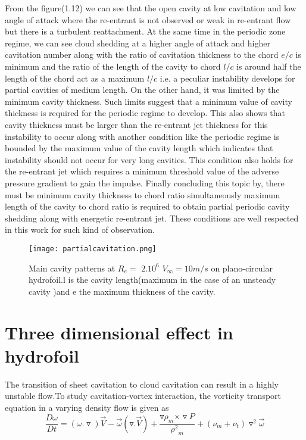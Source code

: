 From the figure(1.12) we can see that the open cavity at low
cavitation and low angle of attack where the re-entrant is not
observed or weak in re-entrant flow but there is a turbulent
reattachment. At the same time in the periodic zone regime, we can see
cloud shedding at a higher angle of attack and higher cavitation
number along with the ratio of cavitation thickness to the chord $e/c$
is minimum and the ratio of the length of the cavity to chord $l/c$ is
around half the length of the chord act as a maximum $l/c$ i.e. a
peculiar instability develops for partial cavities of medium
length. On the other hand, it was limited by the minimum cavity
thickness. Such limits suggest that a minimum value of cavity
thickness is required for the periodic regime to develop. This also
shows that cavity thickness must be larger than the re-entrant jet
thickness for this instability to occur along with another condition
like the periodic regime is bounded by the maximum value of the cavity
length which indicates that instability should not occur for very long
cavities. This condition also holds for the re-entrant jet which
requires a minimum threshold value of the adverse pressure gradient to
gain the impulse. Finally concluding this topic by, there must be
minimum cavity thickness to chord ratio simultaneously maximum length
of the cavity to chord ratio is required to obtain partial periodic
cavity shedding along with energetic re-entrant jet. These conditions
are well respected in this work for such kind of observation.\\

\begin{figure}[H]
 \centering
 \texttt{[image: partialcavitation.png]}
 \caption{Main cavity patterns at $R_e =$ $2.{10}^6$ ${V_{\infty}}
   =10{m}/{s}$ on plano-circular hydrofoil.l is the cavity
   length(maximum in the case of an unsteady cavity )and e the maximum
   thickness of the cavity.\\}
  \label{fig:fig12}
\end{figure}

\section{Three dimensional effect in hydrofoil}
The transition of sheet cavitation to cloud cavitation can result in a
highly unstable flow.To study cavitation-vortex
interaction\cite{JI2015}, the vorticity transport equation in a
varying density flow is given as
\begin{equation}
\frac{D\omega}{Dt}=({\omega.\triangledown})\vec{V}
-\vec{\omega}(\triangledown.\vec{V}) + \frac{{\triangledown{\rho}_m}
  {\times\triangledown P}}{{{\rho}^2}_m} +({\nu}_m
+{\nu}_t){{\triangledown}^2}\vec{\omega}
\end{equation}

